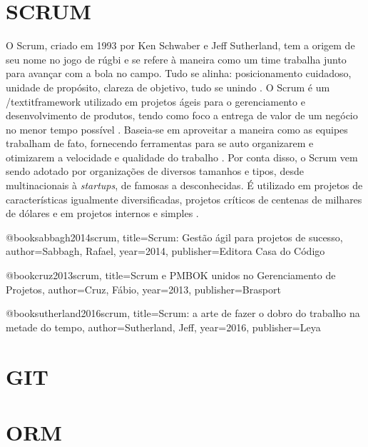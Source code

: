 \section{SCRUM}
O Scrum, criado em 1993 por Ken Schwaber e Jeff Sutherland, tem a origem de seu nome no jogo de rúgbi e se refere à maneira como um time trabalha junto para avançar com a bola no campo. Tudo se alinha: posicionamento cuidadoso, unidade de propósito, clareza de objetivo, tudo se unindo \cite{rocha2015metodologia}.
O Scrum é um /textit{framework} utilizado em projetos ágeis para o gerenciamento e desenvolvimento de produtos, tendo como foco a entrega de valor de um negócio no menor tempo possível \cite{cruz2013scrum}. Baseia-se em aproveitar a maneira como as equipes trabalham de fato, fornecendo ferramentas para se auto organizarem e otimizarem a velocidade e qualidade do trabalho \cite{sutherland2016scrum}.
Por conta disso, o Scrum vem sendo adotado por organizações de diversos tamanhos e tipos, desde multinacionais à \textit{startups}, de famosas a desconhecidas. É utilizado em projetos de características igualmente diversificadas, projetos críticos de centenas de milhares de dólares e em projetos internos e simples \cite{sabbagh2014scrum}.



@book{sabbagh2014scrum,
  title={Scrum: Gest{\~a}o {\'a}gil para projetos de sucesso},
  author={Sabbagh, Rafael},
  year={2014},
  publisher={Editora Casa do C{\'o}digo}
}

@book{cruz2013scrum,
  title={Scrum e PMBOK unidos no Gerenciamento de Projetos},
  author={Cruz, F{\'a}bio},
  year={2013},
  publisher={Brasport}
}

@book{sutherland2016scrum,
  title={Scrum: a arte de fazer o dobro do trabalho na metade do tempo},
  author={Sutherland, Jeff},
  year={2016},
  publisher={Leya}
}

\section{GIT}

\section{ORM}
